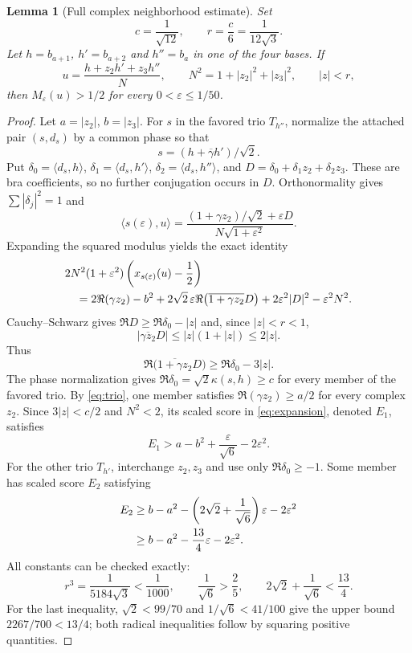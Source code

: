 \documentclass[11pt,a4paper]{article}
\newtheorem{lemma}[theorem]{Lemma}
\theoremstyle{remark}
\numberwithin{equation}{section}
\newcommand{\ip}[2]{\langle #1,#2\rangle}
\begin{document}
\begin{lemma}[Full complex neighborhood estimate]\label{lem:local}
Set
\begin{equation}\label{eq:constants}
 c=\frac1{\sqrt{12}},\qquad r=\frac c6=\frac1{12\sqrt3}.
\end{equation}
Let $h=b_{a+1}$, $h'=b_{a+2}$ and $h''=b_a$ in one of the four bases. If
\[
 u=\frac{h+z_2h'+z_3h''}{N},\qquad
 N^2=1+|z_2|^2+|z_3|^2,\qquad |z|<r,
\]
then $M_\varepsilon(u)>1/2$ for every $0<\varepsilon\le1/50$.
\end{lemma}
\begin{proof}
Let $a=|z_2|$, $b=|z_3|$. For $s$ in the favored trio $T_{h''}$, normalize the attached pair $(s,d_s)$ by a common phase so that
\[
 s=(h+\overline\gamma h')/\sqrt2.
\]
Put $\delta_0=\ip{d_s}h$, $\delta_1=\ip{d_s}{h'}$, $\delta_2=\ip{d_s}{h''}$, and $D=\delta_0+\delta_1z_2+\delta_2z_3$. These are bra coefficients, so no further conjugation occurs in $D$. Orthonormality gives $\sum|\delta_j|^2=1$ and
\[
 \ip{s(\varepsilon)}u=
 \frac{(1+\gamma z_2)/\sqrt2+\varepsilon D}{N\sqrt{1+\varepsilon^2}}.
\]
Expanding the squared modulus yields the exact identity
\begin{align}\label{eq:expansion}
 &2N^2(1+\varepsilon^2)\left(x_{s(\varepsilon)}(u)-\frac12\right)\notag\\
 &\quad=2\Re(\gamma z_2)-b^2
 +2\sqrt2\,\varepsilon\Re\big(\overline{1+\gamma z_2}D\big)
 +2\varepsilon^2|D|^2-\varepsilon^2N^2.
\end{align}
Cauchy--Schwarz gives $\Re D\ge\Re\delta_0-|z|$ and, since $|z|<r<1$,
\[
 |\overline{\gamma z_2}D|\le |z|(1+|z|)\le2|z|.
\]
Thus
\begin{equation}\label{eq:crossbound}
 \Re\big(\overline{1+\gamma z_2}D\big)\ge\Re\delta_0-3|z|.
\end{equation}
The phase normalization gives $\Re\delta_0=\sqrt2\kappa(s,h)\ge c$ for every member of the favored trio. By \eqref{eq:trio}, one member satisfies $\Re(\gamma z_2)\ge a/2$ for every complex $z_2$. Since $3|z|<c/2$ and $N^2<2$, its scaled score in \eqref{eq:expansion}, denoted $E_1$, satisfies
\begin{equation}\label{eq:F}
 E_1>a-b^2+\frac{\varepsilon}{\sqrt6}-2\varepsilon^2.
\end{equation}
For the other trio $T_{h'}$, interchange $z_2,z_3$ and use only $\Re\delta_0\ge-1$. Some member has scaled score $E_2$ satisfying
\begin{align}\label{eq:O}
 E_2&\ge b-a^2-\left(2\sqrt2+\frac1{\sqrt6}\right)\varepsilon-2\varepsilon^2\notag\\
    &\ge b-a^2-\frac{13}{4}\varepsilon-2\varepsilon^2.
\end{align}
All constants can be checked exactly:
\begin{equation}\label{eq:rationalconstants}
 r^3=\frac1{5184\sqrt3}<\frac1{1000},\qquad
 \frac1{\sqrt6}>\frac25,\qquad
 2\sqrt2+\frac1{\sqrt6}<\frac{13}{4}.
\end{equation}
For the last inequality, $\sqrt2<99/70$ and $1/\sqrt6<41/100$ give the upper bound $2267/700<13/4$; both radical inequalities follow by squaring positive quantities.


\end{proof}
\end{document}
